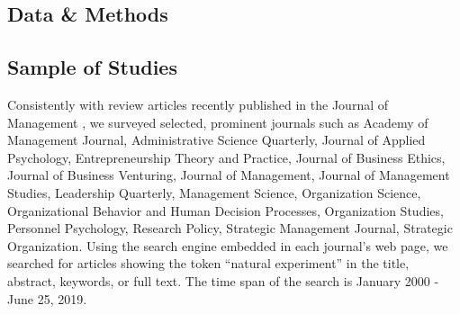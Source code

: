 \documentclass[nobib]{tufte-handout}
\begin{document}
\begin{refsection}
\section{Data \& Methods}
\label{sec:article_selection}

\subsection{Sample of Studies}
\label{subsec:sample_of_studies}


%
%

Consistently with review articles recently published in the Journal of
Management \parencite{gonzalez2018,rindova2018}, we surveyed selected, prominent
journals such as Academy of Management Journal, Administrative Science
Quarterly, Journal of Applied Psychology, Entrepreneurship Theory and Practice,
Journal of Business Ethics, Journal of Business Venturing, Journal of
Management, Journal of Management Studies, Leadership Quarterly, Management
Science, Organization Science, Organizational Behavior and Human Decision
Processes, Organization Studies, Personnel Psychology, Research Policy,
Strategic Management Journal, Strategic Organization. Using the search engine
embedded in each journal’s web page, we searched for articles
showing the token ``natural experiment'' in the title, abstract, keywords, or
full text. The time span of the search is January 2000 - June 25, 2019.


\end{refsection}
\end{document}
